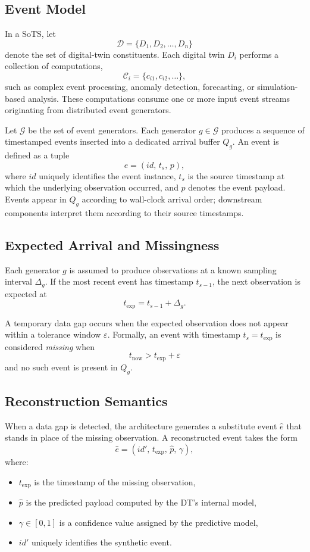 \subsection{Event Model}

In a SoTS, let
\[
\mathcal{D} = \{D_1, D_2, \ldots, D_n\}
\]
denote the set of digital-twin constituents. Each digital twin \(D_i\) performs a collection of computations,
\[
\mathcal{C}_i = \{c_{i1}, c_{i2}, \ldots\},
\]
such as complex event processing, anomaly detection, forecasting, or simulation-based analysis. These computations consume one or more input event streams originating from distributed event generators.

Let \(\mathcal{G}\) be the set of event generators. Each generator \(g \in \mathcal{G}\) produces a sequence of timestamped events inserted into a dedicated arrival buffer \(Q_g\).
An event is defined as a tuple
\[
e = (id,\, t_s,\, p),
\]
where \(id\) uniquely identifies the event instance, \(t_s\) is the source timestamp at which the underlying observation occurred, and \(p\) denotes the event payload.
Events appear in \(Q_g\) according to wall-clock arrival order; downstream components interpret them according to their source timestamps.

\subsection{Expected Arrival and Missingness}

Each generator \(g\) is assumed to produce observations at a known sampling interval \(\Delta_g\).
If the most recent event has timestamp \(t_{s-1}\), the next observation is expected at
\[
t_{\exp} = t_{s-1} + \Delta_g.
\]

A temporary data gap occurs when the expected observation does not appear within a tolerance window \(\varepsilon\). Formally, an event with timestamp \(t_s = t_{\exp}\) is considered \emph{missing} when
\[
t_{\mathrm{now}} > t_{\exp} + \varepsilon
\]
and no such event is present in \(Q_g\).

\subsection{Reconstruction Semantics}

When a data gap is detected, the architecture generates a substitute event \(\hat{e}\) that stands in place of the missing observation. A reconstructed event takes the form
\[
\hat{e} = (id',\, t_{\exp},\, \hat{p},\, \gamma),
\]
where:
\begin{itemize}
    \item \(t_{\exp}\) is the timestamp of the missing observation,
    \item \(\hat{p}\) is the predicted payload computed by the DT's internal model,
    \item \(\gamma \in [0,1]\) is a confidence value assigned by the predictive model,
    \item \(id'\) uniquely identifies the synthetic event.
\end{itemize}

